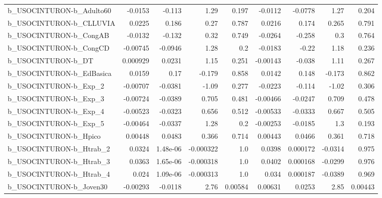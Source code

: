 \begin{tabular}{lrrrrrrrr}
b\_USOCINTURON-b\_Adulto60   &     -0.0153 &       -0.113 &      1.29 &    0.197 &    -0.0112 &     -0.0778 &         1.27 &         0.204 \\
b\_USOCINTURON-b\_CLLUVIA    &      0.0225 &        0.186 &      0.27 &    0.787 &     0.0216 &       0.174 &        0.265 &         0.791 \\
b\_USOCINTURON-b\_CongAB     &     -0.0132 &       -0.132 &      0.32 &    0.749 &    -0.0264 &      -0.258 &          0.3 &         0.764 \\
b\_USOCINTURON-b\_CongCD     &    -0.00745 &      -0.0946 &      1.28 &      0.2 &    -0.0183 &       -0.22 &         1.18 &         0.236 \\
b\_USOCINTURON-b\_DT         &    0.000929 &       0.0231 &      1.15 &    0.251 &   -0.00143 &      -0.038 &         1.11 &         0.267 \\
b\_USOCINTURON-b\_EdBasica   &      0.0159 &         0.17 &    -0.179 &    0.858 &     0.0142 &       0.148 &       -0.173 &         0.862 \\
b\_USOCINTURON-b\_Exp\_2      &    -0.00707 &      -0.0381 &     -1.09 &    0.277 &    -0.0223 &      -0.114 &        -1.02 &         0.306 \\
b\_USOCINTURON-b\_Exp\_3      &    -0.00724 &      -0.0389 &     0.705 &    0.481 &   -0.00466 &     -0.0247 &        0.709 &         0.478 \\
b\_USOCINTURON-b\_Exp\_4      &    -0.00523 &      -0.0323 &     0.656 &    0.512 &   -0.00533 &     -0.0333 &        0.667 &         0.505 \\
b\_USOCINTURON-b\_Exp\_5      &    -0.00464 &      -0.0337 &      1.28 &      0.2 &   -0.00253 &     -0.0185 &          1.3 &         0.193 \\
b\_USOCINTURON-b\_Hpico      &     0.00448 &       0.0483 &     0.366 &    0.714 &    0.00443 &      0.0466 &        0.361 &         0.718 \\
b\_USOCINTURON-b\_Htrab\_2    &      0.0324 &     1.48e-06 & -0.000322 &      1.0 &     0.0398 &    0.000172 &      -0.0314 &         0.975 \\
b\_USOCINTURON-b\_Htrab\_3    &      0.0363 &     1.65e-06 & -0.000318 &      1.0 &     0.0402 &    0.000168 &      -0.0299 &         0.976 \\
b\_USOCINTURON-b\_Htrab\_4    &       0.024 &     1.09e-06 & -0.000313 &      1.0 &      0.034 &    0.000187 &      -0.0389 &         0.969 \\
b\_USOCINTURON-b\_Joven30    &    -0.00293 &      -0.0118 &      2.76 &  0.00584 &    0.00631 &      0.0253 &         2.85 &       0.00443 \\

\end{tabular}
